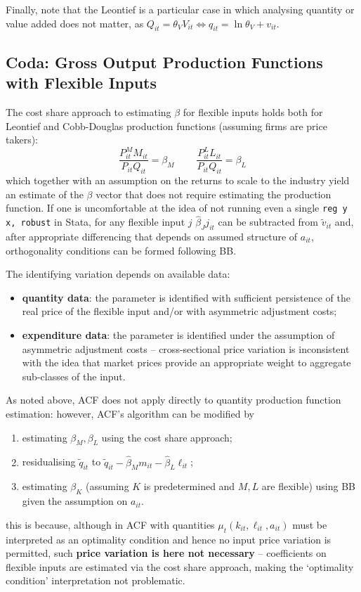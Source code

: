 \documentclass[11pt]{article}
\begin{document}
Finally, note that the Leontief is a particular case in which analysing quantity or value added does not matter, as $Q_{it} = \theta_V V_{it} \Leftrightarrow q_{it} = \ln \theta_V + v_{it}$.

\subsection*{Coda: Gross Output Production Functions with Flexible Inputs}

The cost share approach to estimating $\beta$ for flexible inputs holds both for Leontief and Cobb-Douglas production functions (assuming firms are price takers):
\begin{equation*}
	\frac{P^M_{it} M_{it}}{P_{it}Q_{it}} = \beta_M ~~~~~~~~~~ \frac{P^L_{it} L_{it}}{P_{it}Q_{it}} = \beta_L
\end{equation*}
which together with an assumption on the returns to scale to the industry yield an estimate of the $\beta$ vector that does not require estimating the production function.
If one is uncomfortable at the idea of not running even a single \texttt{reg y x, robust} in Stata, for any flexible input $j$ $\hat{\beta}_J j_{it}$ can be subtracted from $\tilde{v}_{it}$ and, after appropriate differencing that depends on assumed structure of $a_{it}$, orthogonality conditions can be formed following BB.

The identifying variation depends on available data:
\begin{itemize}
	\item \textbf{quantity data}: the parameter is identified with sufficient persistence of the real price of the flexible input and/or with asymmetric adjustment costs;
	\item \textbf{expenditure data}: the parameter is identified under the assumption of asymmetric adjustment costs -- cross-sectional price variation is inconsistent with the idea that market prices provide an appropriate weight to aggregate sub-classes of the input.
\end{itemize}

As noted above, ACF does not apply directly to quantity production function estimation: however, ACF's algorithm can be modified by
\begin{enumerate}
	 \item estimating $\beta_M, \beta_L$ using the cost share approach;
	 \item residualising $\tilde{q}_{it}$ to $\tilde{q}_{it} - \hat{\beta}_M m_{it} - \hat{\beta}_L \ell_{it}$;
	 \item estimating $\beta_K$ (assuming $K$ is predetermined and $M, L$ are flexible) using BB given the assumption on $a_{it}$.
\end{enumerate}
this is because, although in ACF with quantities $\mu_t(k_{it}, \ell_{it}, a_{it})$ must be interpreted as an optimality condition and hence no input price variation is permitted, such \textbf{price variation is here not necessary} -- coefficients on flexible inputs are estimated via the cost share approach, making the `optimality condition' interpretation not problematic.
\end{document}
